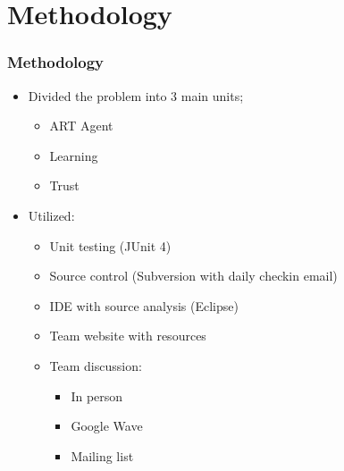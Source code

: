 \section{Methodology}
\begin{frame}
\frametitle{Methodology}
\begin{itemize}
  \item Divided the problem into 3 main units;
  \begin{itemize}
    \item ART Agent
    \item Learning
    \item Trust
  \end{itemize}
\end{itemize}
\begin{itemize}  
  \item Utilized:
  \begin{itemize}
    \item Unit testing (JUnit 4)
    \item Source control (Subversion with daily checkin email)
    \item IDE with source analysis (Eclipse)
    \item Team website with resources
    \item Team discussion:
    \begin{itemize}
      \item In person
      \item Google Wave
      \item Mailing list
    \end{itemize}
  \end{itemize}
\end{itemize}

\end{frame}